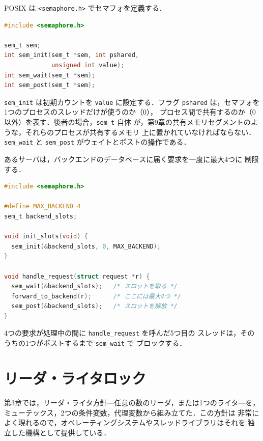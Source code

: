 \documentclass[../main.tex]{subfiles}
\begin{document}
POSIX は \texttt{<semaphore.h>} でセマフォを定義する．
\begin{lstlisting}[language=C, numbers=none]
#include <semaphore.h>

sem_t sem;
int sem_init(sem_t *sem, int pshared,
             unsigned int value);
int sem_wait(sem_t *sem);
int sem_post(sem_t *sem);
\end{lstlisting}
\texttt{sem\_init} は初期カウントを \texttt{value} に設定する．フラグ
\texttt{pshared} は，セマフォを1つのプロセスのスレッドだけが使うのか（0），
プロセス間で共有するのか（0 以外）を表す．後者の場合，\texttt{sem\_t} 自体
が，第9章の共有メモリセグメントのような，それらのプロセスが共有するメモリ
上に置かれていなければならない．\texttt{sem\_wait} と \texttt{sem\_post}
がウェイトとポストの操作である．%

\begin{example}
  あるサーバは，バックエンドのデータベースに届く要求を一度に最大4つに
  制限する．
  \begin{lstlisting}[language=C, numbers=none]
#include <semaphore.h>

#define MAX_BACKEND 4
sem_t backend_slots;

void init_slots(void) {
  sem_init(&backend_slots, 0, MAX_BACKEND);
}

void handle_request(struct request *r) {
  sem_wait(&backend_slots);   /* スロットを取る */
  forward_to_backend(r);      /* ここには最大4つ */
  sem_post(&backend_slots);   /* スロットを解放 */
}
\end{lstlisting}
  4つの要求が処理中の間に \texttt{handle\_request} を呼んだ5つ目の
  スレッドは，そのうちの1つがポストするまで \texttt{sem\_wait} で
  ブロックする．
\end{example}

\section{リーダ・ライタロック}
\label{sec:l10-rwlock}

第3章では，リーダ・ライタ方針---任意の数のリーダ，または1つのライタ---を，
ミューテックス，2つの条件変数，代理変数から組み立てた．この方針は
非常によく現れるので，オペレーティングシステムやスレッドライブラリはそれを
独立した機構として提供している．
\end{document}
